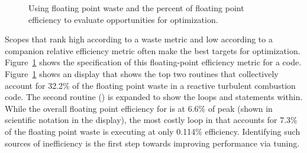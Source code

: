\documentclass[11pt,twoside,letterpaper]{report}
\begin{document}
\begin{figure}[t]
\caption{Using floating point waste and the percent of floating point efficiency to evaluate opportunities for optimization.}
\label{fig:fpefficiency-loop}
\end{figure}

Scopes that rank high according to a waste metric and low according to a companion relative efficiency metric often make the best targets for optimization.
Figure~\ref{fig:fpefficiency-loop} shows the specification of this floating-point efficiency metric for a code.
Figure~\ref{fig:fpefficiency-loop} shows an \hpcviewer{} display that shows the top two routines that collectively account for 32.2\% of the floating point waste in a reactive turbulent combustion code.
The second routine () is expanded to show the loops and statements within.
While the overall floating point efficiency for  is at 6.6\% of peak (shown in scientific notation in the \hpcviewer{} display), the most costly loop in  that accounts for 7.3\% of the floating point waste is executing at only 0.114\% efficiency.
 Identifying such sources of inefficiency is the first step towards improving performance via tuning.


\end{document}
